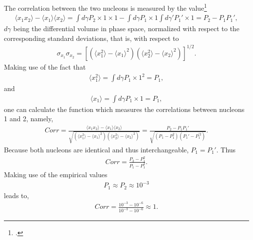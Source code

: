 The correlation between the two nucleons is measured by the value\footnote{\cite{Basdevant:05}.}
\begin{align}
\langle x_1x_2\rangle-\langle x_1\rangle\langle x_2\rangle=\int d \gamma P_2\times 1\times1-\int d \gamma P_1\times 1\int d \gamma' P_1'\times 1=P_2-P_1P_1',
\end{align}
$d\gamma$ being the differential volume in phase space, normalized with respect to the corresponding standard deviations, that is, with respect to
\begin{align}
\sigma_{x_1}\sigma_{x_2}=\left[\left(\langle x_1^2\rangle-\langle x_1\rangle^2\right)\left(\langle x_2^2\rangle-\langle x_2\rangle^2\right)\right]^{1/2}.
\end{align}
Making use of the fact that
\begin{align}
\langle x_1^2\rangle=\int d \gamma P_1\times 1^2=P_1,
\end{align}
and
\begin{align}
\langle x_1\rangle=\int d \gamma P_1\times 1=P_1,
\end{align}
one can calculate the function which measures the correlations between nucleons 1 and 2, namely,
\begin{align}
Corr=\frac{\langle x_1x_2\rangle-\langle x_1\rangle\langle x_2\rangle}{\sqrt{\left(\langle x_1^2\rangle-\langle x_1\rangle^2\right)\left(\langle x_2^2\rangle-\langle x_2\rangle^2\right)}}=\frac{P_2-P_1P_1'}{\sqrt{\left(P_1-P_1^2\right)\left(P_1'-P_1^{'2}\right)}}.
\end{align}
Because both nucleons are identical and thus interchangeable, $P_1=P_1'$. Thus
\begin{align}
Corr=\frac{P_2-P_1^2}{P_1-P_1^2}.
\end{align}
Making use of the empirical values
\begin{align}
P_1\approx P_2\approx 10^{-3}
\end{align}
leads to,
\begin{align}\label{eq3.3.8}
Corr=\frac{10^{-3}-10^{-6}}{10^{-3}-10^{-6}}\approx 1.
\end{align}



